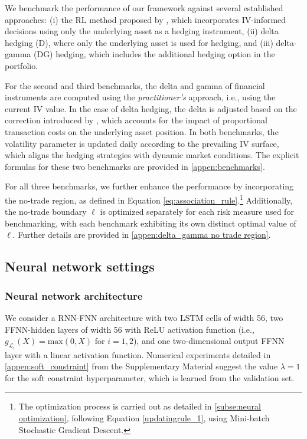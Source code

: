 \documentclass[12pt]{article}
\begin{document}
We benchmark the performance of our framework against several established approaches: (i) the RL method proposed by \cite{François2025}, which incorporates IV-informed decisions using only the underlying asset as a hedging instrument, (ii) delta hedging (D), where only the underlying asset is used for hedging, and (iii) delta-gamma (DG) hedging, which includes the additional hedging option in the portfolio. 

For the second and third benchmarks, the delta and gamma of financial instruments are computed using the \textit{practitioner's} approach, i.e., using the current IV value. 
In the case of delta hedging, the delta is adjusted based on the correction introduced by \cite{Leland}, which accounts for the impact of proportional transaction costs on the underlying asset position. 
In both benchmarks, the volatility parameter is updated daily according to the prevailing IV surface, which aligns the hedging strategies with dynamic market conditions. The explicit formulas for these two benchmarks are provided in \cref{appen:benchmarks}.

For all three benchmarks, we further enhance the performance by incorporating the no-trade region, as defined in Equation \eqref{eq:association_rule}.\footnote{The optimization process is carried out as detailed in \cref{subse:neural optimization}, following Equation \eqref{updatingrule_1}, using Mini-batch Stochastic Gradient Descent.} Additionally, the no-trade boundary $\ell$ is optimized separately for each risk measure used for benchmarking, with each benchmark exhibiting its own distinct optimal value of $\ell$. 
Further details are provided in \cref{appen:delta_gamma no trade region}.



\subsection{Neural network settings}\label{subse:fine-tuning}

\subsubsection{Neural network architecture}
\label{subsub:network_architecture}
We consider a RNN-FNN architecture with two LSTM cells of width 56, two FFNN-hidden layers of width 56 with ReLU activation function (i.e., $g_{\mathcal{L}_{i}}(X)=\text{max}(0,X)$ for $i=1,2$), and one two-dimensional output FFNN layer with a linear activation function. Numerical experiments detailed in \cref{appen:soft_constraint} from the Supplementary Material suggest the value $\lambda=1$ for the soft constraint  hyperparameter, which is learned from the validation set.
\end{document}
